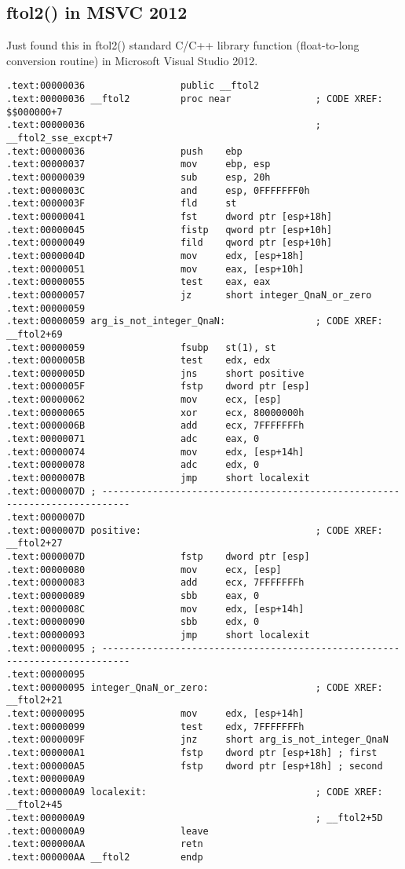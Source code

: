 \subsection{ftol2() in MSVC 2012}

Just found this in ftol2() standard C/C++ library function (float-to-long conversion routine) in Microsoft Visual Studio 2012.

\begin{lstlisting}
.text:00000036                 public __ftol2
.text:00000036 __ftol2         proc near               ; CODE XREF: $$000000+7
.text:00000036                                         ; __ftol2_sse_excpt+7
.text:00000036                 push    ebp
.text:00000037                 mov     ebp, esp
.text:00000039                 sub     esp, 20h
.text:0000003C                 and     esp, 0FFFFFFF0h
.text:0000003F                 fld     st
.text:00000041                 fst     dword ptr [esp+18h]
.text:00000045                 fistp   qword ptr [esp+10h]
.text:00000049                 fild    qword ptr [esp+10h]
.text:0000004D                 mov     edx, [esp+18h]
.text:00000051                 mov     eax, [esp+10h]
.text:00000055                 test    eax, eax
.text:00000057                 jz      short integer_QnaN_or_zero
.text:00000059
.text:00000059 arg_is_not_integer_QnaN:                ; CODE XREF: __ftol2+69
.text:00000059                 fsubp   st(1), st
.text:0000005B                 test    edx, edx
.text:0000005D                 jns     short positive
.text:0000005F                 fstp    dword ptr [esp]
.text:00000062                 mov     ecx, [esp]
.text:00000065                 xor     ecx, 80000000h
.text:0000006B                 add     ecx, 7FFFFFFFh
.text:00000071                 adc     eax, 0
.text:00000074                 mov     edx, [esp+14h]
.text:00000078                 adc     edx, 0
.text:0000007B                 jmp     short localexit
.text:0000007D ; ---------------------------------------------------------------------------
.text:0000007D
.text:0000007D positive:                               ; CODE XREF: __ftol2+27
.text:0000007D                 fstp    dword ptr [esp]
.text:00000080                 mov     ecx, [esp]
.text:00000083                 add     ecx, 7FFFFFFFh
.text:00000089                 sbb     eax, 0
.text:0000008C                 mov     edx, [esp+14h]
.text:00000090                 sbb     edx, 0
.text:00000093                 jmp     short localexit
.text:00000095 ; ---------------------------------------------------------------------------
.text:00000095
.text:00000095 integer_QnaN_or_zero:                   ; CODE XREF: __ftol2+21
.text:00000095                 mov     edx, [esp+14h]
.text:00000099                 test    edx, 7FFFFFFFh
.text:0000009F                 jnz     short arg_is_not_integer_QnaN
.text:000000A1                 fstp    dword ptr [esp+18h] ; first
.text:000000A5                 fstp    dword ptr [esp+18h] ; second
.text:000000A9
.text:000000A9 localexit:                              ; CODE XREF: __ftol2+45
.text:000000A9                                         ; __ftol2+5D
.text:000000A9                 leave
.text:000000AA                 retn
.text:000000AA __ftol2         endp
\end{lstlisting}

